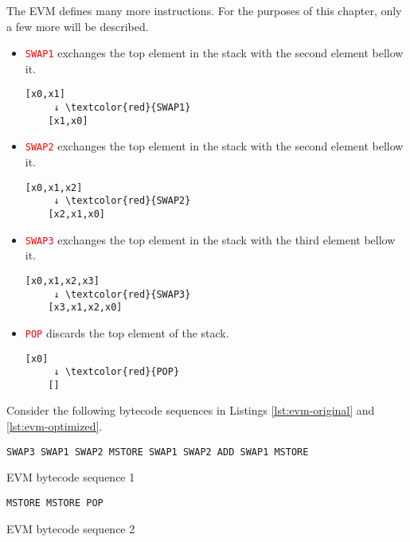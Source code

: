 The EVM defines many more instructions. For the purposes of this chapter, only a few
more will be described.
\begin{itemize}
    \item \textcolor{red}{\texttt{SWAP1}} exchanges the top element in the stack with the
    second element bellow it.
    \begin{Verbatim}[commandchars=\\\{\}]
    [x0,x1]
     ↓ \textcolor{red}{SWAP1}
    [x1,x0]
    \end{Verbatim}

    \item \textcolor{red}{\texttt{SWAP2} } exchanges the top element in the stack with the
    second element bellow it.
    \begin{Verbatim}[commandchars=\\\{\}]
    [x0,x1,x2]
     ↓ \textcolor{red}{SWAP2}
    [x2,x1,x0]
    \end{Verbatim}

    \item \textcolor{red}{\texttt{SWAP3}} exchanges the top element in the stack with the
    third element bellow it.
    \begin{Verbatim}[commandchars=\\\{\}]
    [x0,x1,x2,x3]
     ↓ \textcolor{red}{SWAP3}
    [x3,x1,x2,x0]
    \end{Verbatim}

    \item \textcolor{red}{\texttt{POP}} discards the top element of the stack.
    \begin{Verbatim}[commandchars=\\\{\}]
    [x0] 
     ↓ \textcolor{red}{POP}
    []
    \end{Verbatim}
\end{itemize}


Consider the following bytecode sequences in Listings 
\ref{lst:evm-original} and \ref{lst:evm-optimized}.

\begin{listing}[!ht]
{\color{red}
\begin{verbatim}
SWAP3 SWAP1 SWAP2 MSTORE SWAP1 SWAP2 ADD SWAP1 MSTORE
\end{verbatim}
}
\caption{EVM bytecode sequence 1}
\label{lst:evm-original}
\end{listing}

\begin{listing}[!ht]
{\color{red}
\begin{verbatim}
MSTORE MSTORE POP 
\end{verbatim}
}
\caption{EVM bytecode sequence 2}
\label{lst:evm-optimized}
\end{listing}

